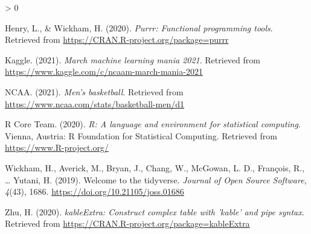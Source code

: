 \documentclass[
  man,floatsintext]{apa6}
\newlength{\cslhangindent}
\newenvironment{CSLReferences}[2] %
 {%
  \setlength{\parindent}{0pt}
  \ifodd #1 \everypar{\setlength{\hangindent}{\cslhangindent}}\ignorespaces\fi
  \ifnum #2 > 0
  \setlength{\parskip}{#2\baselineskip}
  \fi
 }%
 {}
\begin{document}
\hypertarget{refs}{}
\begin{CSLReferences}{1}{0}
\leavevmode\hypertarget{ref-R-purrr}{}%
Henry, L., \& Wickham, H. (2020). \emph{Purrr: Functional programming tools}. Retrieved from \url{https://CRAN.R-project.org/package=purrr}

\leavevmode\hypertarget{ref-R-Kaggle}{}%
Kaggle. (2021). \emph{March machine learning mania 2021}. Retrieved from \url{https://www.kaggle.com/c/ncaam-march-mania-2021}

\leavevmode\hypertarget{ref-R-NCAA}{}%
NCAA. (2021). \emph{Men's basketball}. Retrieved from \url{https://www.ncaa.com/stats/basketball-men/d1}

\leavevmode\hypertarget{ref-R-base}{}%
R Core Team. (2020). \emph{R: A language and environment for statistical computing}. Vienna, Austria: R Foundation for Statistical Computing. Retrieved from \url{https://www.R-project.org/}

\leavevmode\hypertarget{ref-R-tidyverse}{}%
Wickham, H., Averick, M., Bryan, J., Chang, W., McGowan, L. D., François, R., \ldots{} Yutani, H. (2019). Welcome to the {tidyverse}. \emph{Journal of Open Source Software}, \emph{4}(43), 1686. \url{https://doi.org/10.21105/joss.01686}

\leavevmode\hypertarget{ref-R-kableExtra}{}%
Zhu, H. (2020). \emph{kableExtra: Construct complex table with 'kable' and pipe syntax}. Retrieved from \url{https://CRAN.R-project.org/package=kableExtra}

\end{CSLReferences}

\endgroup
\end{document}

